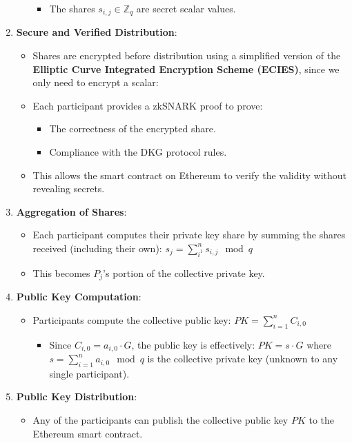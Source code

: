 \begin{enumerate}
\begin{itemize}
					\begin{itemize}
						\item The shares $s_{i,j} \in \mathbb{Z}_q$ are secret scalar values.
					\end{itemize}
			\end{itemize}
	\item \textbf{Secure and Verified Distribution}:
			\begin{itemize}
				\item Shares are encrypted before distribution using a simplified version of the \textbf{Elliptic Curve Integrated Encryption Scheme (ECIES)}, since we only need to encrypt a scalar:
				\item Each participant provides a zkSNARK proof to prove:
					\begin{itemize}
						\item The correctness of the encrypted share.
						\item Compliance with the DKG protocol rules.
					\end{itemize}
				\item This allows the smart contract on Ethereum to verify the validity without revealing secrets.
			\end{itemize}
	\item \textbf{Aggregation of Shares}:
			\begin{itemize}
				\item Each participant computes their private key share by summing the shares received (including their own): $s_j = \sum_{i ^1}^ns_{i,j} \mod q$
				\item This becomes $P_j$'s portion of the collective private key.
			\end{itemize}
	\item \textbf{Public Key Computation}:
			\begin{itemize}
				\item Participants compute the collective public key: $PK = \sum_{i = 1}^n C_{i,0}$
					\begin{itemize}
						\item Since $C_{i,0} = a_{i,0}\cdot G$, the public key is effectively: $PK = s\cdot G$ where $s = \sum_{i = 1}^n a_{i,0} \mod q$ is the collective private key (unknown to any single participant).
					\end{itemize}
			\end{itemize}
	\item \textbf{Public Key Distribution}:
			\begin{itemize}
				\item Any of the participants can publish the collective public key $PK$ to the Ethereum smart contract.
			\end{itemize}
\end{enumerate}